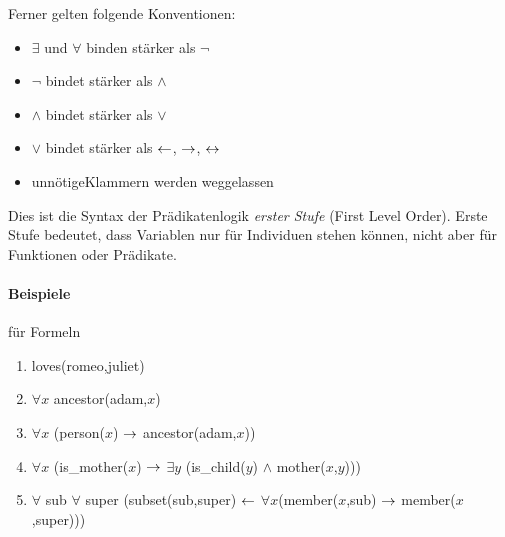 \documentclass[a4paper]{scrartcl}
\begin{document}
Ferner gelten folgende Konventionen:
\begin{itemize}
\item $\exists$ und $\forall$ binden stärker als $\neg$
\item $\neg$ bindet stärker als $\wedge$
\item $\wedge$ bindet stärker als $\vee$
\item $\vee$ bindet stärker als $\leftarrow$, $\rightarrow$, $\leftrightarrow$
\item \glqq unnötige\grqq Klammern werden weggelassen
\end{itemize}

Dies ist die Syntax der Prädikatenlogik \emph{erster Stufe} (First Level Order). Erste Stufe bedeutet, dass Variablen nur für Individuen stehen können, nicht aber für Funktionen oder Prädikate.

\paragraph{Beispiele} für Formeln
\begin{enumerate}
\item  loves(romeo,juliet)
\item $\forall x$ ancestor(adam,$x$)
\item $\forall x$ (person($x$) $\rightarrow$ ancestor(adam,$x$))
\item $\forall x$ (is\_mother($x$) $\rightarrow$ $\exists y$ (is\_child($y$) $\wedge$ mother($x$,$y$)))
\item $\forall$ sub $\forall$ super (subset(sub,super) $\leftarrow$ $\forall x$(member($x$,sub) $\rightarrow$ member($x$,super)))
\end{enumerate}
\end{document}
